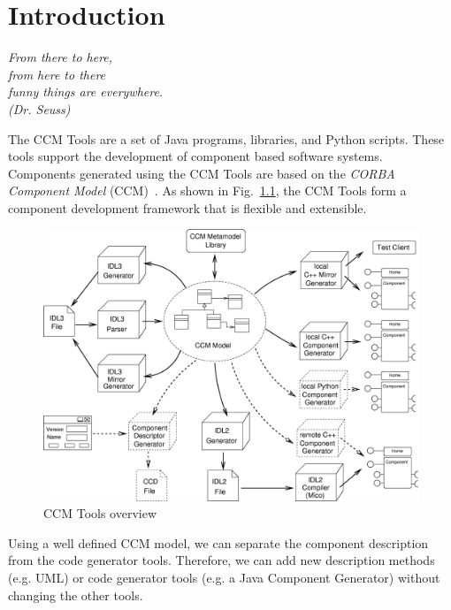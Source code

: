 \chapter{Introduction}
\begin{flushright}
{\it From there to here, \\
     from here to there \\
     funny things are everywhere.\\
		(Dr. Seuss)}

\end{flushright}

The CCM Tools are a set of Java programs, libraries, and Python scripts. These
tools support the development of component based software systems. Components
generated using the CCM Tools are based on the {\it CORBA Component Model}
(CCM)~\cite{CCMSpecification}. As shown in Fig.~\ref{ccmtools}, the CCM Tools
form a component development framework that is flexible and extensible.

\begin{figure}[!htb]
    \begin{center}
        \includegraphics [width=12cm,angle=0] {ComponentGeneratorTools}
        \caption{CCM Tools overview}
        \label{ccmtools}
    \end{center}
\end{figure}

Using a well defined CCM model, we can separate the component description from
the code generator tools. Therefore, we can add new description methods (e.g.
UML) or code generator tools (e.g. a Java Component Generator) without changing
the other tools.

